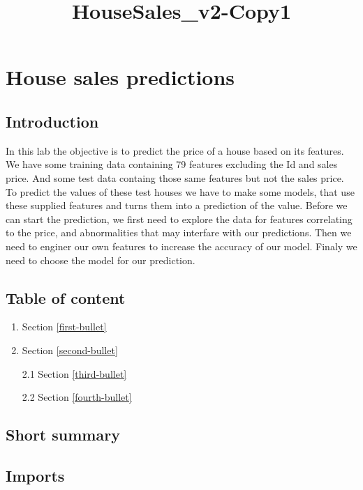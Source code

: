 \documentclass[11pt]{article}
\title{HouseSales\_v2-Copy1}
\begin{document}
    
    
    \maketitle
    
    

    
    \section{House sales predictions}\label{house-sales-predictions}

    \subsection{Introduction}\label{introduction}

    In this lab the objective is to predict the price of a house based on
its features. We have some training data containing 79 features
excluding the Id and sales price. And some test data containg those same
features but not the sales price. To predict the values of these test
houses we have to make some models, that use these supplied features and
turns them into a prediction of the value. Before we can start the
prediction, we first need to explore the data for features correlating
to the price, and abnormalities that may interfare with our predictions.
Then we need to enginer our own features to increase the accuracy of our
model. Finaly we need to choose the model for our prediction.

    \subsection{Table of content}\label{table-of-content}

\begin{enumerate}
\def\labelenumi{\arabic{enumi}.}
\item
  Section \ref{first-bullet}
\item
  Section \ref{second-bullet}

  2.1 Section \ref{third-bullet}

  2.2 Section \ref{fourth-bullet}
\end{enumerate}

    \subsection{Short summary}\label{short-summary}

    \subsection{Imports}\label{imports}
\end{document}
